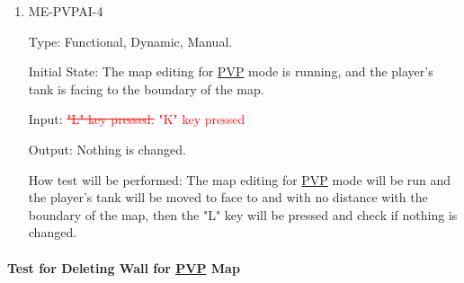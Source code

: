 \documentclass[12pt, titlepage]{article}
\begin{document}
\begin{enumerate}
\item{ME-PVPAI-4\\}

Type: Functional, Dynamic, Manual.
					
Initial State: The map editing for \underline{PVP} mode is running, and the player's tank is facing to the boundary of the map.
					
Input: \textcolor{red}{\sout{"L" key pressed.}} \textcolor{red}{"K" key pressed}
					
Output: Nothing is changed.
					
How test will be performed: The map editing for \underline{PVP} mode will be run and the player's tank will be moved to face to and with no distance with the boundary of the map, then the "L" key will be pressed and check if nothing is changed.

\end{enumerate}

\paragraph{Test for Deleting Wall for \underline{PVP} Map}
\end{document}
